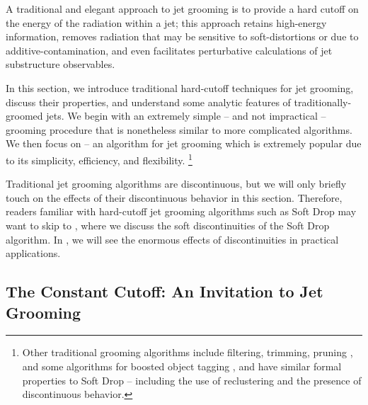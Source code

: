 

A traditional and elegant approach to jet grooming is to provide a hard cutoff on the energy of the radiation within a jet;
%
this approach retains high-energy information, removes radiation that may be sensitive to \glspl{soft-distortion} or due to \gls{additive-contamination}, and even facilitates perturbative calculations of jet substructure observables.


In this section, we introduce traditional hard-cutoff techniques for jet grooming, discuss their properties, and understand some analytic features of traditionally-groomed jets.
%
We begin with an extremely simple -- and not impractical -- grooming procedure that is nonetheless similar to more complicated algorithms.
%
We then focus on  -- an algorithm for jet grooming which is extremely popular due to its simplicity, efficiency, and flexibility.%
\footnote{
    Other traditional grooming algorithms include filtering, trimming, pruning \cite{Dasgupta:2013ihk}, and some algorithms for boosted object tagging \cite{CMS-PAS-JME-09-001}, and have similar formal properties to Soft Drop -- including the use of reclustering and the presence of discontinuous behavior.
}

Traditional jet grooming algorithms are discontinuous, but we will only briefly touch on the effects of their discontinuous behavior in this section.
%
Therefore, readers familiar with hard-cutoff jet grooming algorithms such as Soft Drop may want to skip to , where we discuss the soft discontinuities of the Soft Drop algorithm.
%
In , we will see the enormous effects of discontinuities in practical applications.


\subsection{The Constant Cutoff: An Invitation to Jet Grooming}
\label{sec:constant-cutoff}

